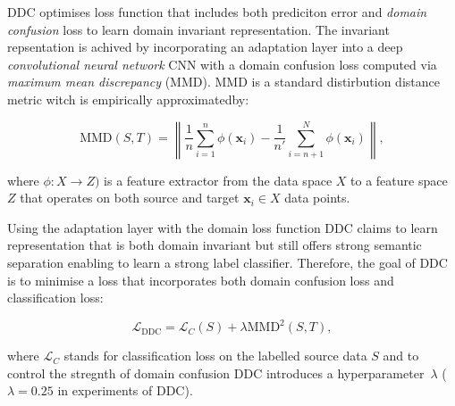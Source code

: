DDC optimises loss function that includes both prediciton error
and \textit{domain confusion} loss to learn domain invariant representation.
The invariant repsentation is achived by incorporating an adaptation layer
into a deep \textit{convolutional neural network} CNN
with a domain confusion loss computed
via \textit{maximum mean discrepancy} (MMD).
MMD is a standard distirbution distance metric witch is empirically approximatedby:

\begin{equation}
	\mathrm{MMD}(S, T) = \left\|
	\frac{1}{n} \sum_{i = 1}^{n} \phi(\mathbf{x}_i) -
	\frac{1}{n'} \sum_{i = n + 1}^{N} \phi(\mathbf{x}_i)
	\right\|,
	\label{maximam_mean_discrepancy}
\end{equation}

where \(\phi: X \to Z)\) is a feature extractor
from the data space \(X\) to a feature space \(Z\)
that operates on both source and target \(\mathbf{x}_i \in X\) data points.

Using the adaptation layer with the domain loss function DDC claims
to learn representation that is both domain invariant
but still offers strong semantic separation
enabling to learn a strong label classifier.
Therefore, the goal of DDC is to minimise a loss that incorporates
both domain confusion loss and classification loss:

\begin{equation}
	\mathcal{L}_{\mathrm{DDC}} = \mathcal{L}_C(S)
	+ \lambda \mathrm{MMD}^2(S, T),
	\label{ddc_loss}
\end{equation}

where \(\mathcal{L}_C\) stands for classification loss on the labelled source data \(S\)
and to control the stregnth of domain confusion DDC introduces a hyperparameter~\(\lambda\)
(\(\lambda = 0.25\) in experiments of DDC).

